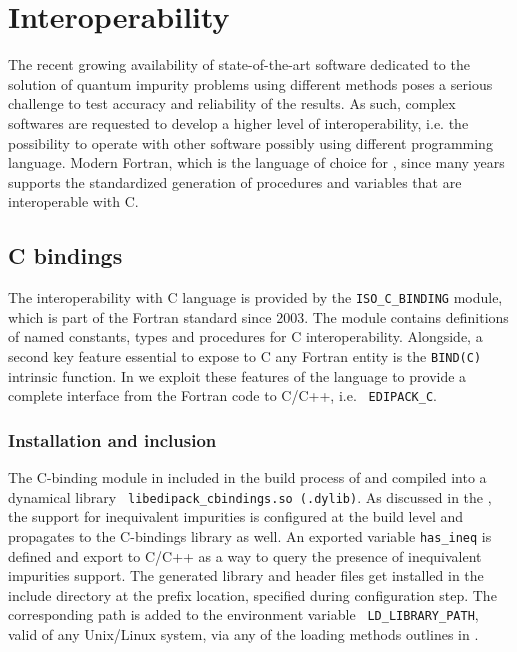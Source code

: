 \documentclass[edipack_sp.tex]{subfiles}
\begin{document}
\section{Interoperability}\label{SecInterop}
The recent growing availability of state-of-the-art software dedicated
to the solution of quantum impurity problems using different methods \cite{Bulla2008RMP,Parcollet2015CPC,Seth2016CPC,Bauernfeind2017PRX,Ganahl2015PRB,Mejuto_Bath_ASCI-DMFT,...}
poses a serious challenge to test accuracy and reliability of the
results.
As such, complex softwares are requested to develop a higher level of
interoperability, i.e. the possibility to operate with other software
possibly using different programming language.
Modern Fortran, which is the language of choice for \NAME, since many
years supports the standardized generation of procedures and
variables that are interoperable with C.


\subsection{C bindings}\label{sSecInteropCbindings}
The interoperability with C language is provided by the
{\tt ISO\_C\_BINDING} module, which is part of the Fortran
standard since 2003. The module contains definitions of named
constants, types and procedures for C interoperability.
Alongside, a second key feature essential to expose to C any Fortran
entity is the {\tt BIND(C)} intrinsic function.
In \NAME we exploit these features of the language to provide a
complete interface from the Fortran code to C/C++, i.e. {\tt
  EDIPACK\_C}. 


\subsubsection{Installation and inclusion}\label{sSecInteropCbindingsInstallation}
The C-binding module in included in the build process of \NAME and
compiled into a dynamical library {\tt
  libedipack\_cbindings.so (.dylib)}. As discussed in the
, the support for inequivalent
impurities is configured at the build level and propagates to the
C-bindings library as well. An exported variable {\tt has\_ineq} is
defined and export to C/C++ as a way to query the presence of
inequivalent impurities support. 
The generated library and header files get installed in the include
directory at the prefix location, specified during configuration
step. The corresponding path is added to the environment variable {\tt
  LD\_LIBRARY\_PATH}, valid of any Unix/Linux system, via any of the
loading methods outlines in . 
\end{document}
